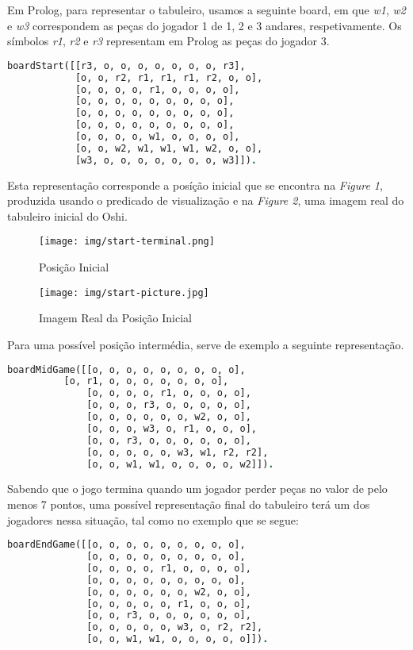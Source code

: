 \documentclass[a4paper]{article}
\begin{document}
Em Prolog, para representar o tabuleiro, usamos a seguinte board, em que \textit{w1}, \textit{w2} e \textit{w3} correspondem as peças do jogador 1 de 1, 2 e 3 andares, respetivamente. Os símbolos \textit{r1}, \textit{r2} e \textit{r3} representam em Prolog as peças do jogador 3.
\bigskip
\begin{lstlisting}[language=Prolog]
    boardStart([[r3, o, o, o, o, o, o, o, r3],
    		[o, o, r2, r1, r1, r1, r2, o, o],
    		[o, o, o, o, r1, o, o, o, o],
    		[o, o, o, o, o, o, o, o, o],
    		[o, o, o, o, o, o, o, o, o],
    		[o, o, o, o, o, o, o, o, o],
    		[o, o, o, o, w1, o, o, o, o],
    		[o, o, w2, w1, w1, w1, w2, o, o],
    		[w3, o, o, o, o, o, o, o, w3]]).
\end{lstlisting}
\bigskip
Esta representação corresponde a posíção inicial que se encontra na \textit{Figure 1}, produzida usando o predicado de visualização e na \textit{Figure 2}, uma imagem real do tabuleiro inicial do Oshi.

\begin{figure}[h!]
\centering
\begin{minipage}{.4\textwidth}
  \centering
  \texttt{[image: img/start-terminal.png]}
  \caption{Posição Inicial}
  \label{fig:start}
\end{minipage}%
\begin{minipage}{.4\textwidth}
  \centering
  \texttt{[image: img/start-picture.jpg]}
  \caption{Imagem Real da Posição Inicial}
  \label{fig:real-pic}
\end{minipage}
\end{figure}

Para uma possível posição intermédia, serve de exemplo a seguinte representação.
\begin{lstlisting}[language=Prolog]
    boardMidGame([[o, o, o, o, o, o, o, o, o],
   		  [o, r1, o, o, o, o, o, o, o],
    		  [o, o, o, o, r1, o, o, o, o],
    	 	  [o, o, o, r3, o, o, o, o, o],
    	 	  [o, o, o, o, o, o, w2, o, o],
    	 	  [o, o, o, w3, o, r1, o, o, o],
    		  [o, o, r3, o, o, o, o, o, o],
    		  [o, o, o, o, o, w3, w1, r2, r2],
    		  [o, o, w1, w1, o, o, o, o, w2]]).
\end{lstlisting}
\clearpage
Sabendo que o jogo termina quando um jogador perder peças no valor de pelo menos 7 pontos, uma possível representação final do tabuleiro terá um dos jogadores nessa situação, tal como no exemplo que se segue:
\bigskip
\begin{lstlisting}[language=Prolog]
	boardEndGame([[o, o, o, o, o, o, o, o, o],
		      [o, o, o, o, o, o, o, o, o],
		      [o, o, o, o, r1, o, o, o, o],
		      [o, o, o, o, o, o, o, o, o],
		      [o, o, o, o, o, o, w2, o, o],
		      [o, o, o, o, o, r1, o, o, o],
		      [o, o, r3, o, o, o, o, o, o],
		      [o, o, o, o, o, w3, o, r2, r2],
		      [o, o, w1, w1, o, o, o, o, o]]).
\end{lstlisting}
\bigskip
\end{document}
